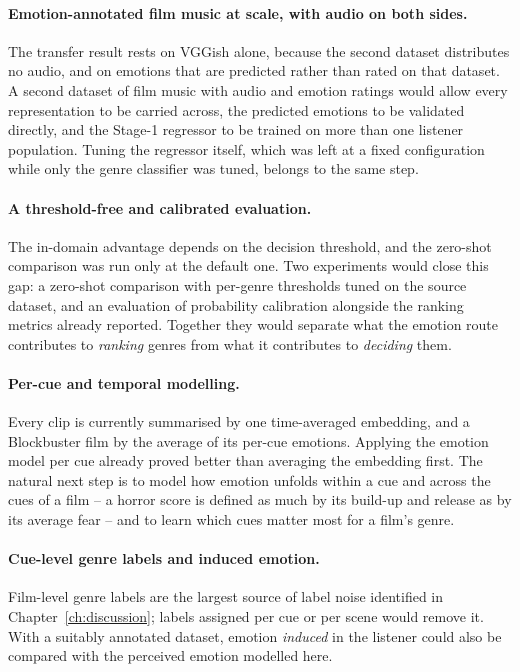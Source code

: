 \paragraph{Emotion-annotated film music at scale, with audio on both sides.} The transfer
result rests on VGGish alone, because the second dataset distributes no audio, and on
emotions that are predicted rather than rated on that dataset. A second dataset of film
music with audio and emotion ratings would allow every representation to be carried across,
the predicted emotions to be validated directly, and the Stage-1 regressor to be trained on
more than one listener population. Tuning the regressor itself, which was left at a fixed
configuration while only the genre classifier was tuned, belongs to the same step.

\paragraph{A threshold-free and calibrated evaluation.} The in-domain advantage depends on
the decision threshold, and the zero-shot comparison was run only at the default one. Two
experiments would close this gap: a zero-shot comparison with per-genre thresholds tuned on
the source dataset, and an evaluation of probability calibration alongside the ranking
metrics already reported. Together they would separate what the emotion route contributes to
\emph{ranking} genres from what it contributes to \emph{deciding} them.

\paragraph{Per-cue and temporal modelling.} Every clip is currently summarised by one
time-averaged embedding, and a Blockbuster film by the average of its per-cue emotions.
Applying the emotion model per cue already proved better than averaging the embedding first.
The natural next step is to model how emotion unfolds within a cue and across the cues of a
film -- a horror score is defined as much by its build-up and release as by its average
fear -- and to learn which cues matter most for a film's genre.

\paragraph{Cue-level genre labels and induced emotion.} Film-level genre labels are the
largest source of label noise identified in Chapter~\ref{ch:discussion}; labels assigned
per cue or per scene would remove it. With a suitably annotated dataset, emotion
\emph{induced} in the listener could also be compared with the perceived emotion modelled
here.

